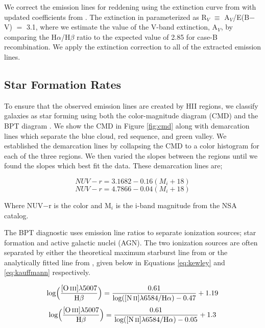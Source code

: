 \documentclass[iop,revtex4,twocolumn,apj,numberedappendix,appendixfloats]{emulateapj}
\begin{document}
We correct the emission lines for reddening using the extinction curve from \citet{Cardelli:1989} with updated coefficients from \citet{ODonnell:1994}. The extinction in parameterized as R$_V$ $\equiv$ A$_V$/E(B$-$V) $=$ 3.1, where we estimate the value of the V-band extinction, A$_V$, by comparing the H$\alpha$/H$\beta$ ratio to the expected value of 2.85 for case-B recombination. We apply the extinction correction to all of the extracted emission lines.

\subsection{Star Formation Rates}
To ensure that the observed emission lines are created by HII regions, we classify galaxies as star forming using both the color-magnitude diagram (CMD) and the BPT diagram \citep{Baldwin:1981}. We show the CMD in Figure \ref{fig:cmd} along with demarcation lines which separate the blue cloud, red sequence, and green valley. We established the demarcation lines by collapsing the CMD to a color histogram for each of the three regions. We then varied the slopes between the regions until we found the slopes which best fit the data. These demarcation lines are;

\begin{equation}\label{eq:blue}
NUV-r = 3.1682 - 0.16 (M_i+18)
\end{equation}
\begin{equation}\label{eq:red}
NUV-r = 4.7866 - 0.04 (M_i+18)
\end{equation}

Where NUV$-$r is the color and M$_i$ is the i-band magnitude from the NSA catalog. 

The BPT diagnostic uses emission line ratios to separate ionization sources; star formation and active galactic nuclei (AGN). The two ionization sources are often separated by either the theoretical maximum starburst line from \citet{Kewley:2001} or the analytically fitted line from \citet{Kauffmann:2003}, given below in Equations \ref{eq:kewley} and \ref{eq:kauffmann} respectively.

\begin{equation}\label{eq:kewley}
\rm{log\Big(\frac{[O\,\textsc{iii}]\lambda 5007}{H\beta}\Big) = \frac{0.61}{log([N\,\textsc{ii}]\lambda 6584 / H\alpha) - 0.47} + 1.19}
\end{equation}
\begin{equation}\label{eq:kauffmann}
\rm{log\Big(\frac{[O\,\textsc{iii}]\lambda 5007}{H\beta}\Big) = \frac{0.61}{log([N\,\textsc{ii}]\lambda 6584 / H\alpha) - 0.05} + 1.3}
\end{equation}
\end{document}

